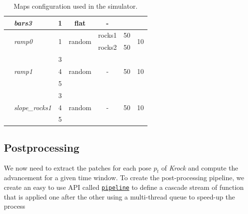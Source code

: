 \documentclass[../document.tex]{subfiles}
\begin{document}
\begin{table}[H]
\begin{tabular}[]{@{}llccccc@{}}
      \hline
      &\emph{bars3} & 1 & flat  & - &  &  \\
      \hline
      &\multirow{2}{*}{\emph{ramp0}} & \multirow{2}{*}{1} & \multirow{2}{*}{random} & rocks1 & 50 & \multirow{2}{*}{10} \\
      &&&& rocks2 & 50 &  \\
      \hline
      &\multirow{3}{*}{\emph{ramp1}} & 3 & \multirow{3}{*}{random} & \multirow{3}{*}{-} & \multirow{3}{*}{50} & \multirow{3}{*}{10} \\
      && 4 &&&& \\
      && 5 &&&& \\
      \hline 
      &\multirow{3}{*}{\emph{slope\_rocks1}} & 3 & \multirow{3}{*}{random} & \multirow{3}{*}{-} & \multirow{3}{*}{50} & \multirow{3}{*}{10} \\
      && 4 &&&& \\
      && 5 &&&& \\
      \bottomrule   
  
    \end{tabular}
    \caption{Maps configuration used in the simulator.}
  
  \end{table}
  


\subsection{Postprocessing}
We now need to extract the patches for each pose $p_t$ of \emph{Krock} and compute the advancement for a given time window. To create the post-processing pipeline, we create an easy to use API called \href{https://github.com/FrancescoSaverioZuppichini/Master-Thesis/tree/master/core/utilities/pipeline}{\texttt{pipeline}} to define a cascade stream of function that is applied one after the other using a multi-thread queue to speed-up the process
\end{document}

